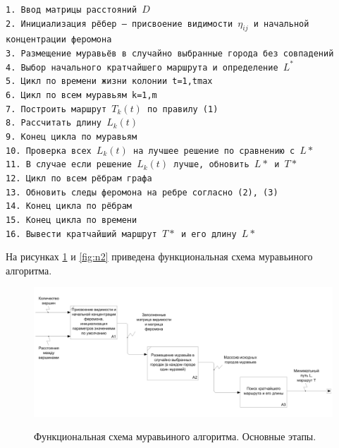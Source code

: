 \documentclass[a4paper,12pt]{article}
\begin{document}
\begin{flushleft}
\texttt{1. Ввод матрицы расстояний $D$\\
2. Инициализация рёбер -- присвоение видимости $\eta_{ij}$ и начальной концентрации
феромона\\
3. Размещение муравьёв в случайно выбранные города без совпадений\\
4. Выбор начального кратчайшего маршрута и определение $L^{*}$\\
5. Цикл по времени жизни колонии t=1,tmax\\
6. \hspace{1.5cm} Цикл по всем муравьям k=1,m\\
7. \hspace{3cm}Построить маршрут $T_{k}(t)$ по правилу (1)\\
8. \hspace{3cm}Рассчитать длину $L_{k}(t)$\\
9. \hspace{1.5cm}Конец цикла по муравьям\\
10. \hspace{1.5cm}Проверка всех $L_{k}(t)$ на лучшее решение по сравнению с $L*$\\
11. \hspace{3cm}В случае если решение $L_{k}(t)$ лучше, обновить $L*$ и $T*$\\
12. \hspace{1.5cm}Цикл по всем рёбрам графа\\
13. \hspace{3cm}Обновить следы феромона на ребре согласно (2), (3)\\
14. \hspace{1.5cm}Конец цикла по рёбрам\\
15. Конец цикла по времени\\
16. Вывести кратчайший маршрут $T*$ и его длину $L*$\\}
\end{flushleft}

На рисунках \ref{fig:n1} и \ref{fig:n2} приведена 
функциональная схема 
муравьиного алгоритма.

\pagebreak
   
\begin{figure}[h!]
\begin{center}
{\includegraphics[width = \textwidth]{img/n1.png}}
\caption{Функциональная схема муравьиного алгоритма. Основные этапы.}
\label{fig:n1}
\end{center}
\end{figure}
\end{document}
